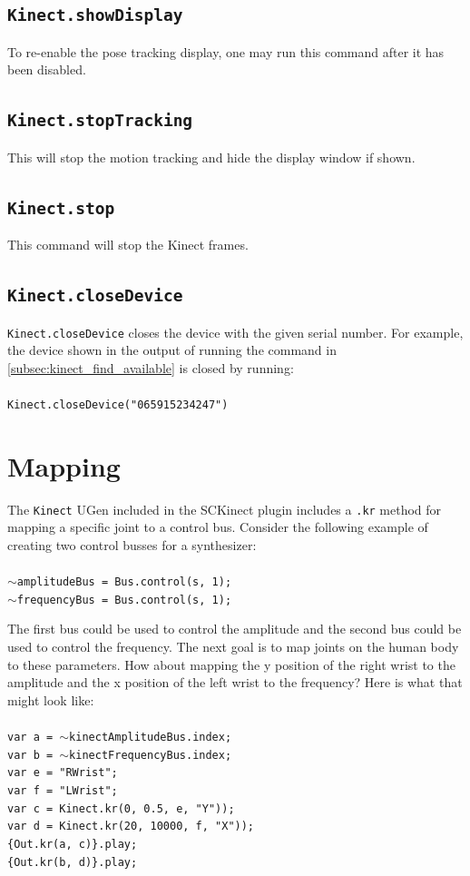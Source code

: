 \documentclass{article}
\begin{document}
\subsection{\texttt{Kinect.showDisplay}}\label{subsec:kinect_show_display}
To re-enable the pose tracking display, one may run this command after it has been disabled.
\subsection{\texttt{Kinect.stopTracking}}\label{subsec:kinect_stop_tracking}
This will stop the motion tracking and hide the display window if shown.
\subsection{\texttt{Kinect.stop}}\label{subsec:kinect_stop}
This command will stop the Kinect frames.
\subsection{\texttt{Kinect.closeDevice}}\label{subsec:kinect_close_device}
\texttt{Kinect.closeDevice} closes the device with the given serial number. For example, the device shown in the output of running the command in \ref{subsec:kinect_find_available} is closed by running:\\
\\
\texttt{Kinect.closeDevice("065915234247")}
\section{Mapping}
The \texttt{Kinect} UGen included in the SCKinect plugin includes a \texttt{.kr} method for mapping a specific joint to a control bus. Consider the following example of creating two control busses for a synthesizer:\\
\texttt{\\
    $\sim$amplitudeBus = Bus.control(s, 1);\\
	$\sim$frequencyBus = Bus.control(s, 1);\\
}

The first bus could be used to control the amplitude and the second bus could be used to control the frequency. The next goal is to map joints on the human body to these parameters. How about mapping the y position of the right wrist to the amplitude and the x position of the left wrist to the frequency? Here is what that might look like:\\
\texttt{\\
    var a = $\sim$kinectAmplitudeBus.index;\\
    var b = $\sim$kinectFrequencyBus.index;\\
    var e = "RWrist";\\
    var f = "LWrist";\\
    var c = Kinect.kr(0, 0.5, e, "Y"));\\
    var d = Kinect.kr(20, 10000, f, "X"));\\
    \{Out.kr(a, c)\}.play;\\
	\{Out.kr(b, d)\}.play;\\
}
\end{document}
